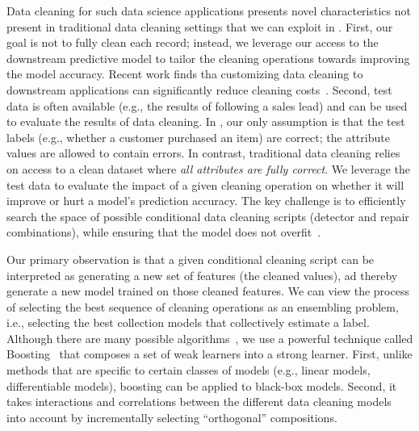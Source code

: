 Data cleaning for such data science applications presents novel characteristics not present in traditional data cleaning settings that we can exploit in \sys.  First, our goal is not to fully clean each record; instead, we leverage our access to the downstream predictive model to tailor the cleaning operations towards improving the model accuracy.  Recent work finds tha customizing data cleaning to downstream applications can significantly reduce cleaning costs~\cite{altwaijry2015query, DBLP:conf/sigmod/BergmanMNT15, DBLP:journals/pvldb/KrishnanWWFG16}.
Second, test data is often available (e.g., the results of following a sales lead) and can be used to evaluate the results of data cleaning.  In \sys, our only assumption is that the test labels (e.g., whether a customer purchased an item) are correct; the attribute values are allowed to contain errors.  In contrast, traditional data cleaning relies on access to a clean dataset where {\it all attributes are fully correct}.  We leverage the test data to evaluate the impact of a given cleaning operation on whether it will improve or hurt a model's prediction accuracy.  The key challenge is to efficiently search the space of possible conditional data cleaning scripts (detector and repair combinations), while ensuring that the model does not overfit~\cite{DBLP:journals/pvldb/KrishnanWWFG16,krishnan2016hilda}.   

Our primary observation is that a given conditional cleaning script can be interpreted as generating a new set of features (the cleaned values), ad thereby generate a new model trained on those cleaned features. 
We can view the process of selecting the best sequence of cleaning operations as an ensembling problem, i.e., selecting the best collection models that collectively estimate a label. 
Although there are many possible algorithms~\cite{dietterich2000ensemble}, we use a powerful technique called Boosting~\cite{freund1995desicion} that composes a set of weak learners into a strong learner.  
First, unlike methods that are specific to certain classes of models (e.g., linear models, differentiable models), boosting can be applied to black-box models. 
Second, it takes interactions and correlations between the different data cleaning models into account by incrementally selecting ``orthogonal'' compositions.




